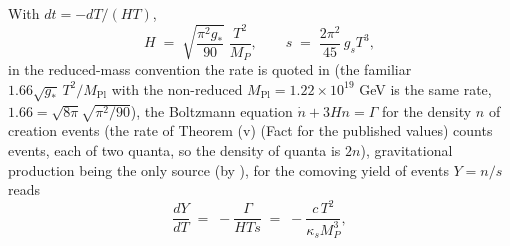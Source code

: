 With $dt = -dT/(HT)$,
\[
H \;=\; \sqrt{\frac{\pi^{2}g_{*}}{90}}\;\frac{T^{2}}{M_{P}}, \qquad s \;=\; \frac{2\pi^{2}}{45}\,g_{s}T^{3},
\]
in the reduced-mass convention the rate is quoted in (the familiar $1.66\sqrt{g_{*}}\,T^{2}/M_{\mathrm{Pl}}$ with the non-reduced $M_{\mathrm{Pl}} = 1.22 \times 10^{19}$ GeV is the same rate, $1.66 = \sqrt{8\pi}\sqrt{\pi^{2}/90}$), the Boltzmann equation $\dot{n} + 3Hn = \Gamma$ for the density $n$ of creation events (the rate of Theorem (v) (Fact  for the published values) counts events, each of two quanta, so the density of quanta is $2n$), gravitational production being the only source (by ), for the comoving yield of events $Y = n/s$ reads
\[
\frac{dY}{dT} \;=\; -\frac{\Gamma}{HTs} \;=\; -\frac{c\,T^{2}}{\kappa_{s}M_{P}^{3}},
\]
